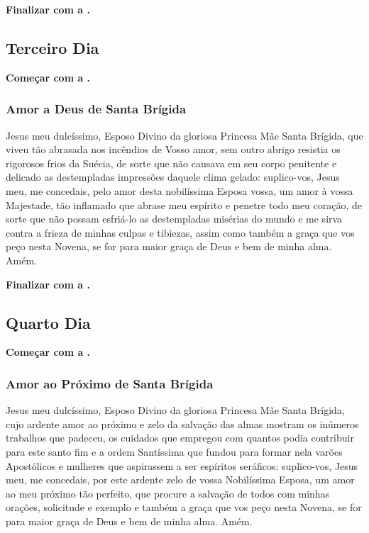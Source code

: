 \documentclass[a4paper,12pt]{extarticle} \usepackage[utf8]{inputenc}
\begin{document}
\noindent
\textbf{Finalizar com a .}


\subsection{Terceiro Dia}

\noindent
\textbf{Começar com a .}

\subsubsection*{Amor a Deus de Santa Brígida}

Jesus meu dulcíssimo, Esposo Divino da gloriosa Princesa Mãe Santa Brígida, que viveu tão abrasada nos incêndios de Vosso amor, sem outro abrigo resistia os rigorosos frios da Suécia, de sorte que não causava em seu corpo penitente e delicado as destempladas impressões daquele clima gelado: suplico-vos, Jesus meu, me concedais, pelo amor desta nobilíssima Esposa vossa, um amor à vossa Majestade, tão inflamado que abrase meu espírito e penetre todo meu coração, de sorte que não possam esfriá-lo as destempladas misérias do mundo e me sirva contra a frieza de minhas culpas e tibiezas, assim como também a graça que vos peço nesta Novena, se for para maior graça de Deus e bem de minha alma. Amém.

\noindent
\textbf{Finalizar com a .}


\subsection{Quarto Dia}

\noindent
\textbf{Começar com a .}

\subsubsection*{Amor ao Próximo de Santa Brígida}

Jesus meu dulcíssimo, Esposo Divino da gloriosa Princesa Mãe Santa Brígida, cujo ardente amor ao próximo e zelo da salvação das almas mostram os inúmeros trabalhos que padeceu, os cuidados que empregou com quantos podia contribuir para este santo fim e a ordem Santíssima que fundou para formar nela varões Apostólicos e mulheres que aspirassem a ser espíritos seráficos: suplico-vos, Jesus meu, me concedais, por este ardente zelo de vossa Nobilíssima Esposa, um amor ao meu próximo tão perfeito, que procure a salvação de todos com minhas orações, solicitude e exemplo e também a graça que vos peço nesta Novena, se for para maior graça de Deus e bem de minha alma. Amém.
\end{document}
